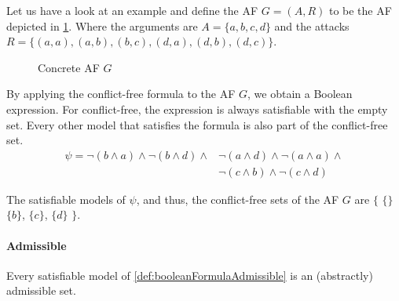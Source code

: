 \begin{example}
    Let us have a look at an example and define the AF $G=(A,R)$ to be the AF depicted in \cref{af:algorithmEncodingsConflictFree}. Where the arguments are $A=\{a, b, c, d\}$ and the attacks $R=\big\{ (a,a), (a,b), (b,c), (d,a), (d,b), (d,c)\big\}$.

    \begin{figure}[H]
        \centering
        \caption{Concrete AF $G$}
        \label{af:algorithmEncodingsConflictFree}
    \end{figure}

By applying the conflict-free formula to the AF $G$, we obtain a Boolean expression. For conflict-free, the expression is always satisfiable with the empty set. Every other model that satisfies the formula is also part of the conflict-free set.
\begin{align*}
    \psi =
    \lnot(b \land a)  \land
    \lnot(b \land d)  \land
    & \lnot(a \land d)  \land
    \lnot(a \land a)  \land
    \\
    & \lnot(c \land b)  \land
    \lnot(c \land d)
\end{align*}

The satisfiable models of $\psi$, and thus, the conflict-free sets of the AF $G$ are $\bigl\{$ $\{\}$ $\{b\}$, $\{c\}$, $\{d\}$ $\bigl\}$.
\end{example}


\paragraph{Admissible} Every satisfiable model of \cref{def:booleanFormulaAdmissible} is an (abstractly) admissible set.

